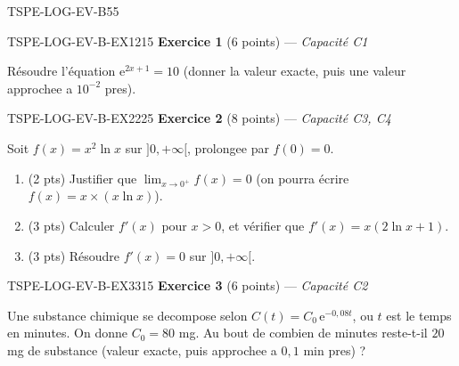 

\begin{evaluation}{TSPE-LOG-EV-B}{55}

\begin{exercice}{TSPE-LOG-EV-B-EX1}{2}{15}
\textbf{Exercice 1} (6 points) — \textit{Capacité C1}

\medskip

Résoudre l'équation $\mathrm{e}^{2x+1} = 10$ (donner la valeur exacte, puis une valeur approchee a $10^{-2}$ pres).
\end{exercice}

\begin{exercice}{TSPE-LOG-EV-B-EX2}{2}{25}
\textbf{Exercice 2} (8 points) — \textit{Capacité C3, C4}

\medskip

Soit $f(x) = x^2 \ln x$ sur $]0, +\infty[$, prolongee par $f(0)=0$.
\begin{enumerate}
  \item (2 pts) Justifier que $\displaystyle\lim_{x\to0^+} f(x) = 0$ (on pourra écrire $f(x) = x \times (x\ln x)$).
  \item (3 pts) Calculer $f'(x)$ pour $x>0$, et vérifier que $f'(x) = x(2\ln x + 1)$.
  \item (3 pts) Résoudre $f'(x)=0$ sur $]0,+\infty[$.
\end{enumerate}
\end{exercice}

\begin{exercice}{TSPE-LOG-EV-B-EX3}{3}{15}
\textbf{Exercice 3} (6 points) — \textit{Capacité C2}

\medskip

Une substance chimique se decompose selon $C(t) = C_0\,\mathrm{e}^{-0{,}08t}$, ou $t$ est le temps en minutes. On donne $C_0 = 80$ mg. Au bout de combien de minutes reste-t-il $20$ mg de substance (valeur exacte, puis approchee a $0{,}1$ min pres) ?
\end{exercice}

\end{evaluation}
